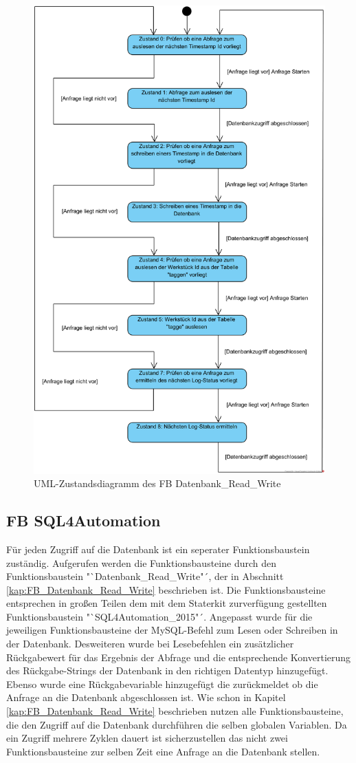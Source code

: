 \begin{figure}[h]
	    \centering
	    \includegraphics[width=0.8\linewidth]{Bilder/Zustandsdiagramme/Datenbank_Read_Write_State_Machine_Diagram.png}
        \caption{UML-Zustandsdiagramm des FB Datenbank\_Read\_Write}
        \label{fig:FB_Datenbank_Read_Write}
\end{figure}

\subsection{FB SQL4Automation}
Für jeden Zugriff auf die Datenbank ist ein seperater Funktionsbaustein zuständig. Aufgerufen werden die Funktionsbausteine durch den Funktionsbaustein "`Datenbank\_Read\_Write"´, der in Abschnitt \ref{kap:FB_Datenbank_Read_Write} beschrieben ist. Die Funktionsbausteine entsprechen in großen Teilen dem mit dem Staterkit zurverfügung gestellten Funktionsbaustein "`SQL4Automation\_2015"´. Angepasst wurde für die jeweiligen Funktionsbausteine der MySQL-Befehl zum Lesen oder Schreiben in der Datenbank. Desweiteren wurde bei Lesebefehlen ein zusätzlicher Rückgabewert für das Ergebnis der Abfrage und die entsprechende Konvertierung des Rückgabe-Strings der Datenbank in den richtigen Datentyp hinzugefügt. Ebenso wurde eine Rückgabevariable hinzugefügt die zurückmeldet ob die Anfrage an die Datenbank abgeschlossen ist. Wie schon in Kapitel \ref{kap:FB_Datenbank_Read_Write} beschrieben nutzen alle Funktionsbausteine, die den Zugriff auf die Datenbank durchführen die selben globalen Variablen. Da ein Zugriff mehrere Zyklen dauert ist sicherzustellen das nicht zwei Funktionsbausteine zur selben Zeit eine Anfrage an die Datenbank stellen. 

